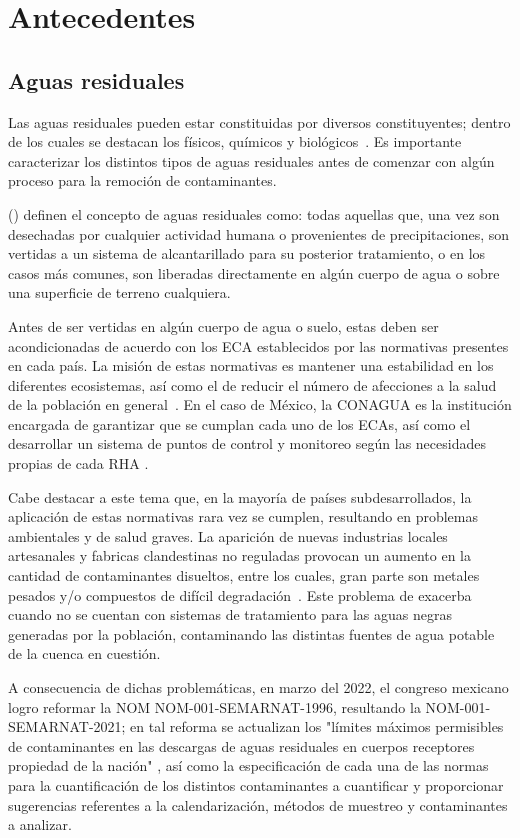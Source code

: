 \section{Antecedentes}
\subsection{Aguas residuales}
Las aguas residuales pueden estar constituidas por diversos constituyentes; dentro de los cuales se destacan los físicos, químicos y biológicos~\citep{crites2000}. Es importante caracterizar los distintos tipos de aguas residuales antes de comenzar con algún proceso para la remoción de contaminantes.\par
\citeauthor{metcalf2003} (\citeyear{metcalf2003}) definen el concepto de aguas residuales como: todas aquellas que, una vez son desechadas por cualquier actividad humana o provenientes de precipitaciones, son vertidas a un sistema de alcantarillado para su posterior tratamiento, o en los casos más comunes, son liberadas directamente en algún cuerpo de agua o sobre una superficie de terreno cualquiera.\par
Antes de ser vertidas en algún cuerpo de agua o suelo, estas deben ser acondicionadas de acuerdo con los \gls{ECA} establecidos por las normativas presentes en cada país. La misión de estas normativas es mantener una estabilidad en los diferentes ecosistemas, así como el de reducir el número de afecciones a la salud de la población en general~\citep{lazcano2016,martinez1999}. En el caso de México, la \gls{CONAGUA} es la institución encargada de garantizar que se cumplan cada uno de los \acrshort{ECA}s, así como el desarrollar un sistema de puntos de control y monitoreo según las necesidades propias de cada \gls{RHA} \citep{Ortiz2013}. \par
Cabe destacar a este tema que, en la mayoría de países subdesarrollados, la aplicación de estas normativas rara vez se cumplen, resultando en problemas ambientales y de salud graves. La aparición de nuevas industrias locales artesanales y fabricas clandestinas no reguladas provocan un aumento en la cantidad de contaminantes disueltos, entre los cuales, gran parte son metales pesados y/o compuestos de difícil degradación~\cite{metcalf2003}.
Este problema de exacerba cuando no se cuentan con sistemas de tratamiento para las aguas negras generadas por la población, contaminando las distintas fuentes de agua potable de la cuenca en cuestión.\par
A consecuencia de dichas problemáticas, en marzo del 2022, el congreso mexicano logro reformar la \gls{NOM} NOM-001-SEMARNAT-1996, resultando la NOM-001-SEMARNAT-2021; en tal reforma se actualizan los "límites máximos permisibles de contaminantes en las descargas de aguas residuales en cuerpos receptores propiedad de la nación" \citep{NOM2021}, así como la especificación de cada una de las normas para la cuantificación de los distintos contaminantes a cuantificar y proporcionar sugerencias referentes a la calendarización, métodos de muestreo y contaminantes a analizar.\par
